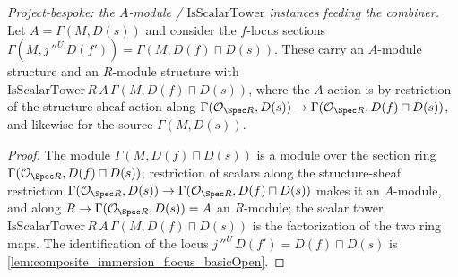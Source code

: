 \begin{lemma}
  \label{lem:flocus_section_scalar_tower}
  \textit{Project-bespoke: the $A$-module / $\mathrm{IsScalarTower}$ instances feeding the combiner.}
  Let \(A = \Gamma(M, D(s))\) and consider the \(f\)-locus sections \(\Gamma(M, j\,''^{U}\,D(f')) =
  \Gamma(M, D(f) \sqcap D(s))\). These carry an \(A\)-module structure and an \(R\)-module structure with
  \(\mathrm{IsScalarTower}\,R\,A\,\Gamma(M, D(f) \sqcap D(s))\), where the \(A\)-action is by restriction
  of the structure-sheaf action along \(\Gamma(\mathcal{O}_{\Spec R}, D(s)) \to \Gamma(\mathcal{O}_{\Spec
  R}, D(f) \sqcap D(s))\), and likewise for the source \(\Gamma(M, D(s))\).
\end{lemma}
\begin{proof}
  The module \(\Gamma(M, D(f) \sqcap D(s))\) is a module over the section ring
  \(\Gamma(\mathcal{O}_{\Spec R}, D(f) \sqcap D(s))\); restriction of scalars along the structure-sheaf
  restriction \(\Gamma(\mathcal{O}_{\Spec R}, D(s)) \to \Gamma(\mathcal{O}_{\Spec R}, D(f) \sqcap D(s))\)
  makes it an \(A\)-module, and along \(R \to \Gamma(\mathcal{O}_{\Spec R}, D(s)) = A\) an \(R\)-module;
  the scalar tower \(\mathrm{IsScalarTower}\,R\,A\,\Gamma(M, D(f) \sqcap D(s))\) is the factorization of
  the two ring maps. The identification of the locus \(j\,''^{U}\,D(f') = D(f) \sqcap D(s)\) is
  \cref{lem:composite_immersion_flocus_basicOpen}.
\end{proof}

